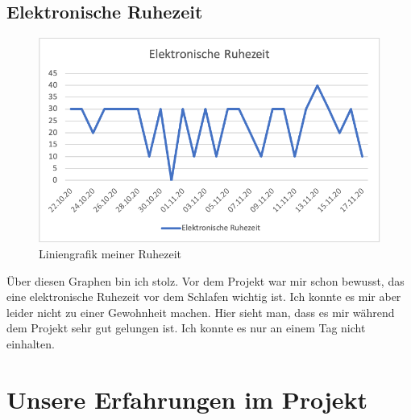 \subsection{Elektronische Ruhezeit}
\begin{figure}[!ht]
  \centering
  \includegraphics[width=0.6\linewidth]{./images/ruhezeit_jonas.png}
  \caption{Liniengrafik meiner Ruhezeit}
  \label{fig:ruhezeit_jonas}
\end{figure}
Über diesen Graphen bin ich stolz. Vor dem Projekt war mir schon bewusst, das eine elektronische Ruhezeit vor dem Schlafen wichtig ist. Ich konnte es mir aber leider nicht zu einer Gewohnheit machen. Hier sieht man, dass es mir während dem Projekt sehr gut gelungen ist. Ich konnte es nur an einem Tag nicht einhalten.
\section{Unsere Erfahrungen im Projekt}